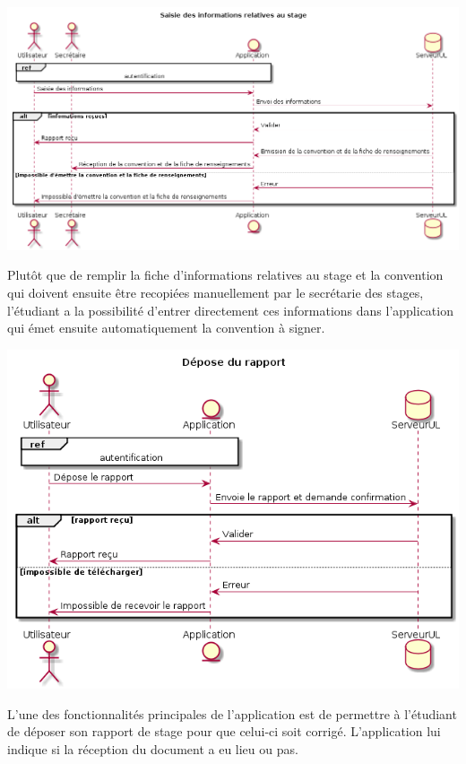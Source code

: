 \documentclass{scrreprt}
\begin{document}
\begin{center}
	\includegraphics[scale=0.4]{image/saisieInfosStage.png}
\end{center}
\hspace{1cm}Plutôt que de remplir la fiche d'informations relatives au stage et la convention qui doivent ensuite être recopiées manuellement par le secrétarie des stages, l'étudiant a la possibilité d'entrer directement ces informations dans l'application qui émet ensuite automatiquement la convention à signer.

\begin{center}
	\includegraphics[scale=0.55]{image/deposeRapport.png}
\end{center}
\hspace{1cm}L'une des fonctionnalités principales de l'application est de permettre à l'étudiant de déposer son rapport de stage pour que celui-ci soit corrigé. L'application lui indique si la réception du document a eu lieu ou pas.
\end{document}
